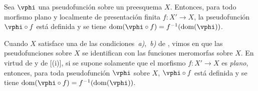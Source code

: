 \begin{corollary}[20.3.12]
\label{IV.20.3.12}
Sea $\vphi$ una pseudofunción sobre un preesquema $X$.
Entonces, para todo morfismo plano y localmente de presentación finita $f:X'\to X$, la pseudofunción $\vphi\circ f$ está definida y se tiene $\operatorname{dom}(\vphi\circ f)=f^{-1}(\operatorname{dom}(\vphi))$.
\end{corollary}

\begin{remark}[20.3.13]
\label{IV.20.3.13}
Cuando $X$ satisface una de las condiciones~\emph{a)},~\emph{b)} de , vimos en  que las pseudofunciones sobre $X$ se identifican con las funciones meromorfas sobre $X$.
En virtud de  y de [(i)], si se supone solamente que el morfismo $f:X'\to X$ es \emph{plano}, entonces, para toda pseudofunción $\vphi$ sobre $X$, $\vphi\circ f$ está definida y se tiene $\operatorname{dom}(\vphi\circ f)=f^{-1}(\operatorname{dom}(\vphi))$.
\end{remark}
